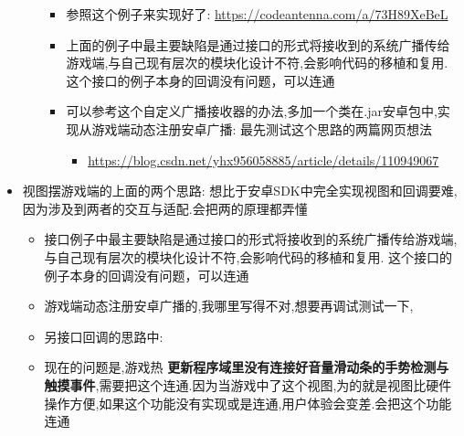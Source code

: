 \documentclass[9pt, b5paper]{article}
\begin{document}
\begin{itemize}
\begin{itemize}
\begin{itemize}
\item 参照这个例子来实现好了: \url{https://codeantenna.com/a/73H89XeBeL}
\item 上面的例子中最主要缺陷是通过接口的形式将接收到的系统广播传给游戏端,与自己现有层次的模块化设计不符,会影响代码的移植和复用. 这个接口的例子本身的回调没有问题，可以连通
\item 可以参考这个自定义广播接收器的办法,多加一个类在.jar安卓包中,实现从游戏端动态注册安卓广播: 最先测试这个思路的两篇网页想法
\begin{itemize}
\item \url{https://blog.csdn.net/yhx956058885/article/details/110949067}
\end{itemize}
\end{itemize}
\end{itemize}

\item 视图摆游戏端的上面的两个思路: 想比于安卓SDK中完全实现视图和回调要难,因为涉及到两者的交互与适配.会把两的原理都弄懂
\begin{itemize}
\item 接口例子中最主要缺陷是通过接口的形式将接收到的系统广播传给游戏端,与自己现有层次的模块化设计不符,会影响代码的移植和复用. 这个接口的例子本身的回调没有问题，可以连通
\item 游戏端动态注册安卓广播的,我哪里写得不对,想要再调试测试一下,　　　　
\item 另接口回调的思路中:
\item 现在的问题是,游戏热 \textbf{更新程序域里没有连接好音量滑动条的手势检测与触摸事件},需要把这个连通.因为当游戏中了这个视图,为的就是视图比硬件操作方便,如果这个功能没有实现或是连通,用户体验会变差.会把这个功能连通
\end{itemize}
\end{itemize}
\end{document}
